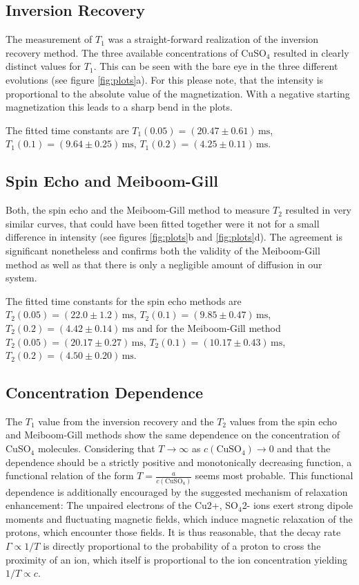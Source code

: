 \documentclass[a4paper]{scrartcl}
\numberwithin{equation}{section}
\numberwithin{figure}{section}
\numberwithin{table}{section}
\begin{document}
\subsection{Inversion Recovery}
The measurement of $T_1$ was a straight-forward realization of the inversion recovery method. The three available concentrations of CuSO$_4$ resulted in clearly distinct values for $T_1$. This can be seen with the bare eye in the three different evolutions (see figure \ref{fig:plots}a). For this please note, that the intensity is proportional to the absolute value of the magnetization. With a negative starting magnetization this leads to a sharp bend in the plots.

The fitted time constants are $T_1(0.05)=(20.47\pm 0.61)\,\text{ms}$, $T_1(0.1)=(9.64\pm 0.25)\,\text{ms}$, $T_1(0.2)=(4.25\pm 0.11)\,\text{ms}$.

\subsection{Spin Echo and Meiboom-Gill}
Both, the spin echo and the Meiboom-Gill method to measure $T_2$ resulted in very similar curves, that could have been fitted together were it not for a small difference in intensity (see figures \ref{fig:plots}b and \ref{fig:plots}d). The agreement is significant nonetheless and confirms both the validity of the Meiboom-Gill method as well as that there is only a negligible amount of diffusion in our system.

The fitted time constants for the spin echo methods are $T_2(0.05)=(22.0\pm 1.2)\,\text{ms}$, $T_2(0.1)=(9.85\pm 0.47)\,\text{ms}$, $T_2(0.2)=(4.42\pm 0.14)\,\text{ms}$ and for the Meiboom-Gill method $T_2(0.05)=(20.17\pm 0.27)\,\text{ms}$, $T_2(0.1)=(10.17\pm 0.43)\,\text{ms}$, $T_2(0.2)=(4.50\pm 0.20)\,\text{ms}$.

\subsection{Concentration Dependence}
The $T_1$ value from the inversion recovery and the $T_2$ values from the spin echo and Meiboom-Gill methods show the same dependence on the concentration of CuSO$_4$ molecules. Considering that $T\rightarrow\infty$ as $c(\text{CuSO}_4)\rightarrow 0$ and that the dependence should be a strictly positive and monotonically decreasing function, a functional relation of the form $T=\frac{a}{c(\text{CuSO}_4)}$ seems most probable. This functional dependence is additionally encouraged by the suggested mechanism of relaxation enhancement: The unpaired electrons of the Cu2+, SO$_4$2- ions exert strong dipole moments and fluctuating magnetic fields, which induce magnetic relaxation of the protons, which encounter those fields. It is thus reasonable, that the decay rate $\Gamma \propto 1/T$ is directly proportional to the probability of a proton to cross the proximity of an ion, which itself is proportional to the ion concentration yielding $1/T \propto c$. 
\end{document}
